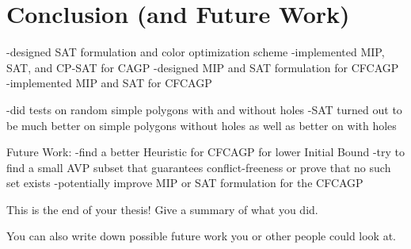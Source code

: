 \chapter{Conclusion (and Future Work)}

-designed SAT formulation and color optimization scheme
-implemented MIP, SAT, and CP-SAT for CAGP
-designed MIP and SAT formulation for CFCAGP
-implemented MIP and SAT for CFCAGP

-did tests on random simple polygons with and without holes
-SAT turned out to be much better on simple polygons without holes as well as better on with holes

Future Work:
-find a better Heuristic for CFCAGP for lower Initial Bound
-try to find a small AVP subset that guarantees conflict-freeness or prove that no such set exists
-potentially improve MIP or SAT formulation for the CFCAGP

This is the end of your thesis! 
Give a summary of what you did.

You can also write down possible future work you or other people could look at.